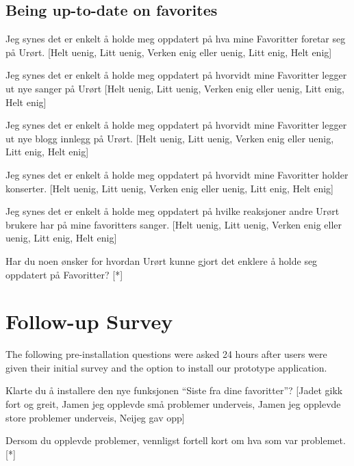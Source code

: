 \subsection{Being up-to-date on favorites}

\begin{enum}
  \item Jeg synes det er enkelt å holde meg oppdatert på
    hva mine Favoritter foretar seg på Urørt.
    [Helt uenig, Litt uenig, Verken enig eller uenig, Litt enig, Helt enig]
  \item Jeg synes det er enkelt å holde meg oppdatert på
    hvorvidt mine Favoritter legger ut nye sanger på Urørt
    [Helt uenig, Litt uenig, Verken enig eller uenig, Litt enig, Helt enig]
  \item Jeg synes det er enkelt å holde meg oppdatert på
    hvorvidt mine Favoritter legger ut nye blogg innlegg på Urørt.
    [Helt uenig, Litt uenig, Verken enig eller uenig, Litt enig, Helt enig]
  \item Jeg synes det er enkelt å holde meg oppdatert på
    hvorvidt mine Favoritter holder konserter.
    [Helt uenig, Litt uenig, Verken enig eller uenig, Litt enig, Helt enig]
  \item Jeg synes det er enkelt å holde meg oppdatert på
    hvilke reaksjoner andre Urørt brukere har på mine favoritters sanger.
    [Helt uenig, Litt uenig, Verken enig eller uenig, Litt enig, Helt enig]
  \item Har du noen ønsker for hvordan Urørt kunne gjort det enklere å holde
    seg oppdatert på Favoritter? [*]
\end{enum}


\section{Follow-up Survey}

The following pre-installation questions were asked 24 hours after users were
given their initial survey and the option to install our prototype
application.

\begin{enum}
  \item * Klarte du å installere den nye funksjonen ``Siste fra dine
    favoritter''?
    [Ja\dash{}det gikk fort og greit,
    Ja\dash{}men jeg opplevde små problemer underveis,
    Ja\dash{}men jeg opplevde store problemer underveis,
    Nei\dash{}jeg gav opp]
  \item Dersom du opplevde problemer, vennligst fortell kort om hva som var
    problemet. [*]
\end{enum}


